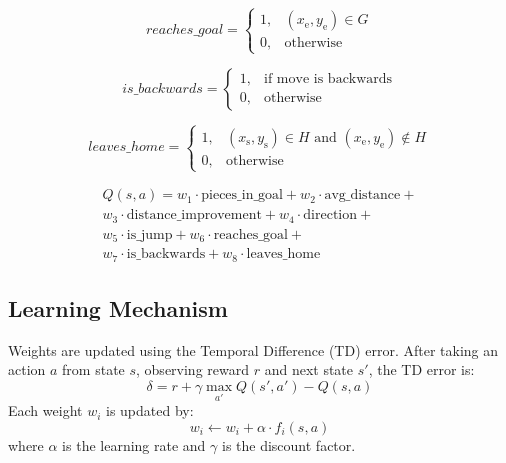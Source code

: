 \begin{equation}
reaches\_goal = 
\begin{cases} 
1, & (x_{\text{e}}, y_{\text{e}}) \in G \\
0, & \text{otherwise}
\end{cases}
\end{equation}

\begin{equation}
is\_backwards = 
\begin{cases} 
1, & \text{if move is backwards} \\
0, & \text{otherwise}
\end{cases}
\end{equation}

\begin{equation}
leaves\_home = 
\begin{cases} 
1, & (x_{\text{s}}, y_{\text{s}}) \in H \text{ and } (x_{\text{e}}, y_{\text{e}}) \notin H \\
0, & \text{otherwise}
\end{cases}
\end{equation}

\begin{equation}
\begin{split}
Q(s, a) = w_1 \cdot \text{pieces\_in\_goal} + w_2 \cdot  \text{avg\_distance} + 
\\ w_3 \cdot \text{distance\_improvement} + w_4 \cdot \text{direction} + \\ w_5 \cdot \text{is\_jump} + w_6 \cdot \text{reaches\_goal} + 
\\ w_7 \cdot \text{is\_backwards} + w_8 \cdot \text{leaves\_home}
\end{split}
\end{equation}

\subsection{Learning Mechanism}
Weights are updated using the Temporal Difference (TD) error. After taking an action $a$ from state $s$, observing reward $r$ and next state $s'$, the TD error is:
\begin{equation}
    \delta = r + \gamma \max_{a'} Q(s',a') - Q(s,a)
\end{equation}
Each weight $w_i$ is updated by:
\begin{equation}
w_i \leftarrow w_i + \alpha \cdot f_i(s,a)
\end{equation}
where $\alpha$ is the learning rate and $\gamma$ is the discount factor.

